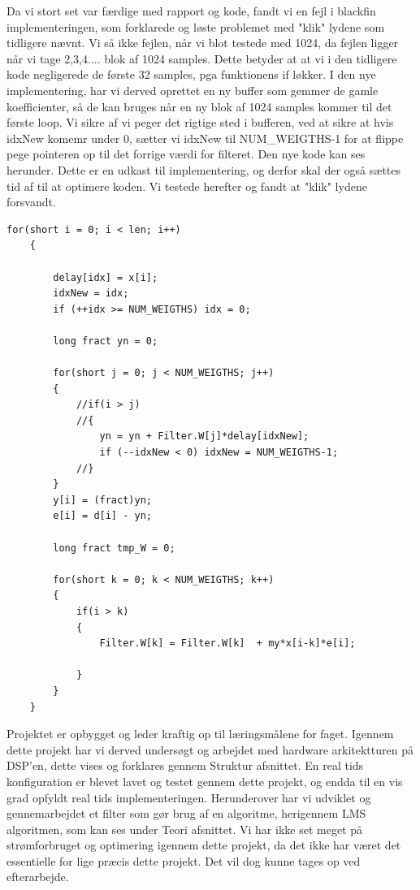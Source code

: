 \begin{description}[align=left]
\item [Løsning i sidste time.] Da vi stort set var færdige med rapport og kode, fandt vi en fejl i blackfin implementeringen, som forklarede og løste problemet med "klik" lydene som tidligere nævnt. 
Vi så ikke fejlen, når vi blot testede med 1024, da fejlen ligger når vi tage 2,3,4.... blok af 1024 samples. Dette betyder at at vi i den tidligere kode negligerede de første 32 samples, pga funktionens if løkker. I den nye implementering, har vi derved oprettet en ny buffer som gemmer de gamle koefficienter, så de kan bruges når en ny blok af 1024 samples kommer til det første loop. Vi sikre af vi peger det rigtige sted i bufferen, ved at sikre at hvis idxNew komemr under 0, sætter vi idxNew til NUM\_WEIGTHS-1 for at flippe pege pointeren op til det forrige værdi for filteret. Den nye kode kan ses herunder. Dette er en udkast til implementering, og derfor skal der også sættes tid af til at optimere koden. Vi testede herefter og fandt at "klik" lydene forsvandt. \\
\begin{lstlisting}
for(short i = 0; i < len; i++)
	{

		delay[idx] = x[i];
		idxNew = idx;
		if (++idx >= NUM_WEIGTHS) idx = 0;

		long fract yn = 0;

		for(short j = 0; j < NUM_WEIGTHS; j++)
		{
			//if(i > j)
			//{
				yn = yn + Filter.W[j]*delay[idxNew];
				if (--idxNew < 0) idxNew = NUM_WEIGTHS-1;
			//}
		}
		y[i] = (fract)yn;
		e[i] = d[i] - yn;

		long fract tmp_W = 0;

		for(short k = 0; k < NUM_WEIGTHS; k++)
		{
			if(i > k)
			{
				Filter.W[k] = Filter.W[k]  + my*x[i-k]*e[i];

			}
		}
	}
\end{lstlisting}

\item [Læringsmål.] Projektet er opbygget og leder kraftig op til læringsmålene for faget. Igennem dette projekt har vi derved undersøgt og arbejdet med hardware arkitektturen på DSP'en, dette vises og forklares gennem Struktur afsnittet. En real tids konfiguration er blevet lavet og testet gennem dette projekt, og endda til en vis grad opfyldt real tids implementeringen. Herunderover har vi udviklet og gennemarbejdet et filter som gør brug af en algoritme, herigennem LMS algoritmen, som kan ses under Teori afsnittet. Vi har ikke set meget på strømforbruget og optimering igennem dette projekt, da det ikke har været det essentielle for lige præcis dette projekt. Det vil dog kunne tages op ved efterarbejde.    


\end{description}

